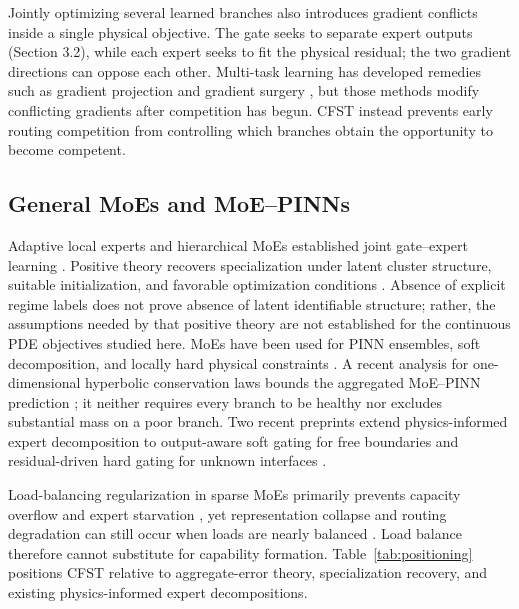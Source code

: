 \documentclass[preprint,12pt]{elsarticle}
\theoremstyle{remark}
\begin{document}
Jointly optimizing several learned branches also introduces gradient conflicts inside a single physical objective. The gate seeks to separate expert outputs (Section 3.2), while each expert seeks to fit the physical residual; the two gradient directions can oppose each other. Multi-task learning has developed remedies such as gradient projection and gradient surgery \cite{yu2020gradsurgery}, but those methods modify conflicting gradients after competition has begun. CFST instead prevents early routing competition from controlling which branches obtain the opportunity to become competent.

\subsection{General MoEs and MoE--PINNs}
Adaptive local experts and hierarchical MoEs established joint gate--expert learning \cite{jacobs1991,jordan1994}. Positive theory recovers specialization under latent cluster structure, suitable initialization, and favorable optimization conditions \cite{chen2022moe}. Absence of explicit regime labels does not prove absence of latent identifiable structure; rather, the assumptions needed by that positive theory are not established for the continuous PDE objectives studied here. MoEs have been used for PINN ensembles, soft decomposition, and locally hard physical constraints \cite{bischof2021,hu2023,chalapathi2024}. A recent analysis for one-dimensional hyperbolic conservation laws bounds the aggregated MoE--PINN prediction \cite{dan2025moepinn}; it neither requires every branch to be healthy nor excludes substantial mass on a poor branch. Two recent preprints extend physics-informed expert decomposition to output-aware soft gating for free boundaries and residual-driven hard gating for unknown interfaces \cite{barkhudaryan2026dmoe,peng2026pimoe}.

Load-balancing regularization in sparse MoEs primarily prevents capacity overflow and expert starvation \cite{shazeer2017,fedus2022}, yet representation collapse and routing degradation can still occur when loads are nearly balanced \cite{chi2022collapse}. Load balance therefore cannot substitute for capability formation. Table~\ref{tab:positioning} positions CFST relative to aggregate-error theory, specialization recovery, and existing physics-informed expert decompositions.
\end{document}
